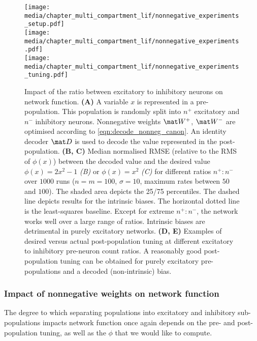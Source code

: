 \begin{figure}[p]
	\centering
	\texttt{[image: media/chapter\_multi\_compartment\_lif/nonnegative\_experiments\_setup.pdf]}\\[0.75cm]	\texttt{[image: media/chapter\_multi\_compartment\_lif/nonnegative\_experiments.pdf]}\\[0.75cm]
	\texttt{[image: media/chapter\_multi\_compartment\_lif/nonnegative\_experiments\_tuning.pdf]}%
	{\label{fig:nonnegative_experiments_a}}%
	{\label{fig:nonnegative_experiments_b}}%
	{\label{fig:nonnegative_experiments_c}}%
	{\label{fig:nonnegative_experiments_d}}%
	{\label{fig:nonnegative_experiments_e}}%
	\caption[Impact of the ratio between excitatory to inhibitory neurons on network function]{Impact of the ratio between excitatory to inhibitory neurons on network function.
	\textbf{(A)} A variable $x$ is represented in a pre-population. This population is randomly split into $n^+$ excitatory and $n^-$ inhibitory neurons. Nonnegative weights $\mat W^+$, $\mat W^-$ are optimised according to \cref{eqn:decode_nonneg_canon}. An identity decoder $\mat D$ is used to decode the value represented in the post-population.
	\textbf{(B, C)} Median normalised RMSE (relative to the RMS of $\phi(x)$) between the decoded value and the desired value $\phi(x) = 2x^2 - 1$ \emph{(B)} or $\phi(x) = x^2$ \emph{(C)} for different ratios $n^+ \!\! : \! n^-$ over $1000$ runs ($n = m = 100$, $\sigma = 10$, maximum rates between $50$ and $100$). The shaded area depicts the 25/75 percentiles. The dashed line depicts results for the intrinsic biases. The horizontal dotted line is the least-squares baseline.
	Except for extreme $n^+ \!\! : \! n^-$, the network works well over a large range of ratios.
	Intrinsic biases are detrimental in purely excitatory networks.
	\textbf{(D, E)} Examples of desired versus actual post-population tuning at different excitatory to inhibitory pre-neuron count ratios.
	A reasonably good post-population tuning can be obtained for purely excitatory pre-populations and a decoded (non-intrinsic) bias.
	}
	\label{fig:nonnegative_experiments}
\end{figure}

\subsubsection{Impact of nonnegative weights on network function}
The degree to which separating populations into excitatory and inhibitory sub-populations impacts network function once again depends on the pre- and post-population tuning, as well as the $\phi$ that we would like to compute.

